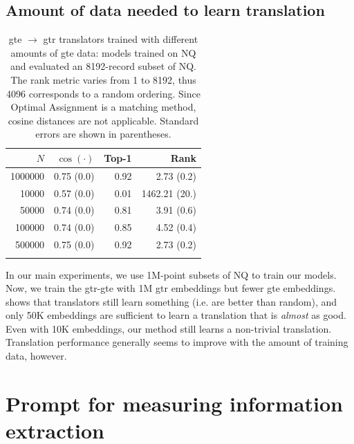\subsection{Amount of data needed to learn translation}
\begin{table}[!ht]
    \centering
    \begin{tabular}{rrrr}
        \toprule
        $N$ & $\cos(\cdot)$ & Top-1 & Rank \\
        \midrule
        1000000&0.75 {\scriptsize (0.0)} & 0.92 & 2.73 {\scriptsize (0.2)}\\
        \midrule
        10000 & 0.57 {\scriptsize (0.0)} & 0.01 &  1462.21 {\scriptsize (20.)}\\
        50000 & 0.74 {\scriptsize (0.0)} & 0.81 &  3.91 {\scriptsize (0.6)}\\
        100000  & 0.74 {\scriptsize (0.0)} & 0.85 &  4.52 {\scriptsize (0.4)}\\
        500000 & 0.75 {\scriptsize (0.0)} & 0.92 &  2.73 {\scriptsize (0.2)}\\
        \bottomrule\\[-1.6ex]
    \end{tabular}
    \caption{gte $\to$ gtr translators trained with different amounts of gte data: \atk{} models trained on NQ and evaluated an 8192-record subset of NQ. The rank metric varies from 1 to 8192, thus 4096 corresponds to a random ordering. Since Optimal Assignment is a matching method, cosine distances are not applicable. Standard errors are shown in parentheses.}
    \label{tab:n_data}
\end{table}

In our main experiments, we use 1M-point subsets of NQ to train our \atk{} models. 
Now, we train the gtr-gte \atk{} with
1M gtr embeddings but fewer gte embeddings.
 shows that translators still learn something (i.e. are better than random), and only 50K embeddings are sufficient to learn a translation that is \textit{almost} as good.   Even with 10K embeddings, our method still learns a non-trivial translation. Translation performance generally seems to improve with the amount of training data, however.

\section{Prompt for measuring information extraction}
\label{sec:prompt}

